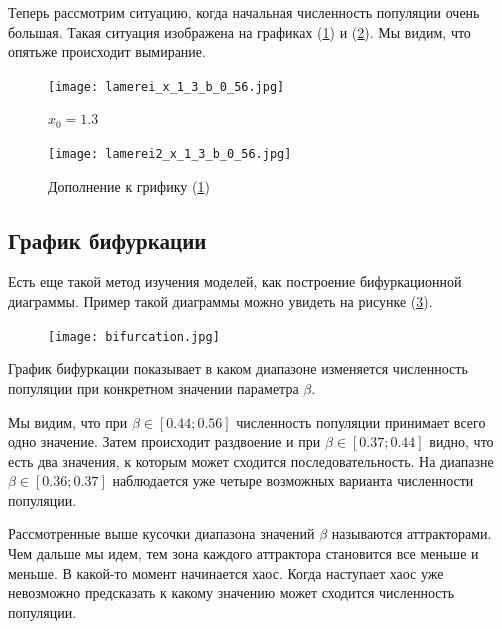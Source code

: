        Теперь рассмотрим ситуацию, когда начальная численность популяции очень большая. Такая ситуация изображена на графиках (\ref{lamerei_x_1_3_b_0_56}) и (\ref{lamerei2_x_1_3_b_0_56}). Мы видим, что опятьже происходит вымирание.
            
        \begin{figure}
            \centering
            \texttt{[image: lamerei\_x\_1\_3\_b\_0\_56.jpg]}
    
            \captionsetup{justification=centering}
            \caption{\(x_0 = 1.3\)}
            \label{lamerei_x_1_3_b_0_56}
        \end{figure}
            
        \begin{figure}
            \centering
            \texttt{[image: lamerei2\_x\_1\_3\_b\_0\_56.jpg]}
    
            \captionsetup{justification=centering}
            \caption{Дополнение к грифику (\ref{lamerei_x_1_3_b_0_56})}
            \label{lamerei2_x_1_3_b_0_56}
        \end{figure}

    \subsection{График бифуркации}

        Есть еще такой метод изучения моделей, как построение бифуркационной диаграммы. Пример такой диаграммы можно увидеть на рисунке (\ref{bifurcation}).

        \begin{figure}
            \centering
            \texttt{[image: bifurcation.jpg]}

            \captionsetup{justification=centering}
            \caption{}
            \label{bifurcation}
        \end{figure}

        График бифуркации показывает в каком диапазоне изменяется численность популяции при конкретном значении параметра \(\beta\).

        Мы видим, что при \(\beta \in [0.44; 0.56]\) численность популяции принимает всего одно значение. Затем происходит раздвоение и при \(\beta \in [0.37; 0.44]\) видно, что есть два значения, к которым может сходится последовательность. На диапазне \(\beta \in [0.36; 0.37]\) наблюдается уже четыре возможных варианта численности популяции. 
        
        Рассмотренные выше кусочки диапазона значений \(\beta\) называются аттракторами. Чем дальше мы идем, тем зона каждого аттрактора становится все меньше и меньше. В какой-то момент начинается хаос. Когда наступает хаос уже невозможно предсказать к какому значению может сходится численность популяции.


